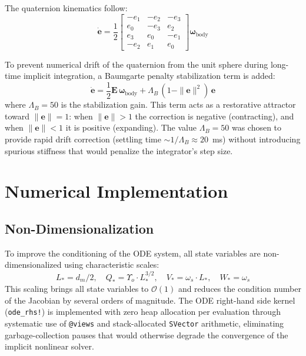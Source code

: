 \documentclass[preprint,12pt]{elsarticle}
\begin{document}
The quaternion kinematics follow:
\begin{equation}
    \dot{\bm{e}} = \frac{1}{2} \begin{bmatrix}
        -e_1 & -e_2 & -e_3 \\
        e_0 & -e_3 & e_2 \\
        e_3 & e_0 & -e_1 \\
        -e_2 & e_1 & e_0
    \end{bmatrix} \bm{\omega}_{\text{body}}
    \label{eq:quat_kin}
\end{equation}

To prevent numerical drift of the quaternion from the unit sphere during long-time implicit integration, a Baumgarte penalty stabilization term is added:
\begin{equation}
    \dot{\bm{e}} = \frac{1}{2}\mathbf{E}\,\bm{\omega}_{\text{body}} + \Lambda_B\,(1 - \|\bm{e}\|^2)\,\bm{e}
    \label{eq:baumgarte}
\end{equation}
where $\Lambda_B = 50$ is the stabilization gain. This term acts as a restorative attractor toward $\|\bm{e}\| = 1$: when $\|\bm{e}\| > 1$ the correction is negative (contracting), and when $\|\bm{e}\| < 1$ it is positive (expanding). The value $\Lambda_B = 50$ was chosen to provide rapid drift correction (settling time $\sim 1/\Lambda_B \approx 20$~ms) without introducing spurious stiffness that would penalize the integrator's step size.


\section{Numerical Implementation}
\label{sec:numerical}

\subsection{Non-Dimensionalization}

To improve the conditioning of the ODE system, all state variables are non-dimensionalized using characteristic scales:
\begin{equation}
    L_* = d_m/2, \quad Q_* = \Upsilon_o \cdot L_*^{3/2}, \quad V_* = \omega_s \cdot L_*, \quad W_* = \omega_s
\end{equation}
This scaling brings all state variables to $\mathcal{O}(1)$ and reduces the condition number of the Jacobian by several orders of magnitude. The ODE right-hand side kernel (\texttt{ode\_rhs!}) is implemented with zero heap allocation per evaluation through systematic use of \texttt{@views} and stack-allocated \texttt{SVector} arithmetic, eliminating garbage-collection pauses that would otherwise degrade the convergence of the implicit nonlinear solver.
\end{document}
